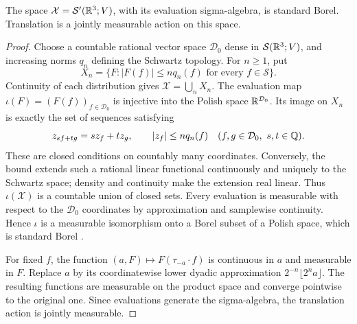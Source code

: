 \begin{lemma}\label{lem:standard-borel}
The space \(\mathcal X=\mathcal S'(\mathbb R^3;V)\), with its evaluation
sigma-algebra, is standard Borel. Translation is a jointly measurable
action on this space.
\end{lemma}
\begin{proof}
Choose a countable rational vector space \(\mathcal D_0\) dense in
\(\mathcal S(\mathbb R^3;V)\), and increasing norms \(q_n\) defining the
Schwartz topology. For \(n\ge1\), put
\[
 X_n=\{F:|F(f)|\le n q_n(f)\text{ for every }f\in\mathcal S\}.
\]
Continuity of each distribution gives \(\mathcal X=\bigcup_nX_n\).
The evaluation map
\(\iota(F)=(F(f))_{f\in\mathcal D_0}\) is injective into the
Polish space \(\mathbb R^{\mathcal D_0}\).
Its image on \(X_n\) is exactly the set of sequences satisfying
\[
 z_{sf+tg}=sz_f+tz_g,\qquad |z_f|\le n q_n(f)
 \quad(f,g\in\mathcal D_0,\ s,t\in\mathbb Q).
\]
These are closed conditions on countably many coordinates.
Conversely, the bound extends such a rational linear functional
continuously and uniquely to the Schwartz space; density and
continuity make the extension real linear.
Thus \(\iota(\mathcal X)\) is a countable union of closed sets.
Every evaluation is measurable with respect to the
\(\mathcal D_0\) coordinates by approximation and samplewise
continuity. Hence \(\iota\) is a measurable isomorphism onto a
Borel subset of a Polish space, which is standard Borel
\cite[Theorem~2.1.22]{Durrett2019}.

For fixed \(f\), the function
\((a,F)\mapsto F(\tau_{-a}\cdot f)\) is continuous in \(a\) and
measurable in \(F\). Replace \(a\) by its coordinatewise lower
dyadic approximation \(2^{-n}\lfloor2^na\rfloor\).
The resulting functions are measurable on the product space and
converge pointwise to the original one. Since evaluations generate
the sigma-algebra, the translation action is jointly measurable.
\end{proof}

